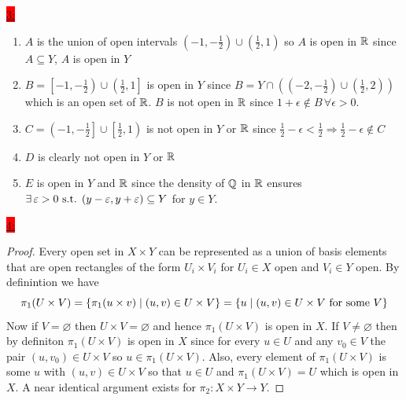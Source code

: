 \documentclass{exam}
\begin{document}
\colorbox{red}{\underline{3:}}
\begin{solution}
    \begin{enumerate}
        \item $A$ is the union of open intervals $\left(-1, -\frac{1}{2}\right) \cup \left(\frac{1}{2}, 1\right)$ so $A$ is open in $\mathbb R$ since $A \subseteq Y$, $A$ is open in $Y$
        \item $B = \left[-1, -\frac{1}{2}\right) \cup \left(\frac{1}{2}, 1\right]$ is open in $Y$ since $B = Y \cap \left(\left(-2, -\frac{1}{2}\right) \cup \left(\frac{1}{2}, 2 \right)\right)$ which is an open set of $\mathbb R$. $B$ is not open in $\mathbb R$ since $1 + \epsilon \not\in B\, \forall \epsilon > 0$. 
        \item $C = \left(-1, -\frac{1}{2}\right] \cup \left[\frac{1}{2}, 1\right)$ is not open in $Y$ or $\mathbb R$ since $\frac{1}{2} - \epsilon < \frac{1}{2} \Rightarrow \frac{1}{2} - \epsilon \not\in C$
        \item $D$ is clearly not open in $Y$ or $\mathbb R$
        \item $E$ is open in $Y$ and $\mathbb R$ since the density of $\mathbb Q$ in $\mathbb R$ ensures $\exists\, \varepsilon > 0 \text{ s.t. } (y - \varepsilon, y + \varepsilon) \subseteq Y$ for $y \in Y$.
    \end{enumerate}   
\end{solution}

\colorbox{red}{\underline{4:}}
\begin{solution}
    \begin{proof}
        Every open set in $X \times Y$ can be represented as a union of basis elements that are open rectangles of the form $U_i \times V_i$ for $U_i \in X$ open and $V_i \in Y$ open. By definintion we have 
        \[
            \pi_1(U \times V) = \left\{\pi_1(u \times v) \mid (u, v) \in U \times V \right\} = \left\{u \mid (u, v) \in U \times V \text{ for some } V \right\}
        \]
        Now if $V = \varnothing$ then $U \times V = \varnothing$ and hence $\pi_1(U \times V)$ is open in $X$. If $V \neq \varnothing$ then by definiton $\pi_1(U \times V)$ is open in $X$ since for every $u \in U$ and any $v_0 \in V$ the pair $(u, v_0) \in U \times V$ so $u \in \pi_1(U \times V)$. Also, every element of $\pi_1(U \times V)$ is some $u$ with $(u, v) \in U \times V$ so that $u \in U$ and $\pi_1(U \times V) = U$ which is open in $X$. A near identical argument exists for $\pi_2: X \times Y \to Y$.
    \end{proof}
\end{solution}
\end{document}
